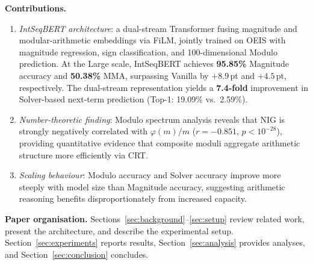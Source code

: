 \noindent\textbf{Contributions.}
\begin{enumerate}
  \item \textit{IntSeqBERT architecture}: a dual-stream Transformer fusing magnitude and
        modular-arithmetic embeddings via FiLM, jointly trained on OEIS with magnitude
        regression, sign classification, and 100-dimensional Modulo prediction. At the
        Large scale, IntSeqBERT achieves \textbf{95.85\%} Magnitude accuracy and
        \textbf{50.38\%} MMA, surpassing Vanilla by $+8.9$\,pt and $+4.5$\,pt, respectively.
        The dual-stream representation yields a \textbf{7.4-fold} improvement in
        Solver-based next-term prediction (Top-1: 19.09\% vs.\ 2.59\%).

  \item \textit{Number-theoretic finding}: Modulo spectrum analysis reveals that NIG is
        strongly negatively correlated with $\varphi(m)/m$ ($r = {-}0.851$, $p < 10^{-28}$),
        providing quantitative evidence that composite moduli aggregate arithmetic structure
        more efficiently via CRT.

  \item \textit{Scaling behaviour}: Modulo accuracy and Solver accuracy improve more steeply
        with model size than Magnitude accuracy, suggesting arithmetic reasoning benefits
        disproportionately from increased capacity.
\end{enumerate}

\noindent\textbf{Paper organisation.}
Sections~\ref{sec:background}--\ref{sec:setup} review related work, present the architecture,
and describe the experimental setup. Section~\ref{sec:experiments} reports results, Section~\ref{sec:analysis} provides analyses, and Section~\ref{sec:conclusion} concludes.
